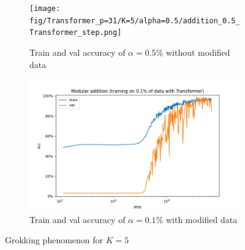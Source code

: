 \begin{figure}[!ht]
	\centering
	\begin{subfigure}{0.45\textwidth}
		\centering
		\texttt{[image: fig/Transformer\_p=31/K=5/alpha=0.5/addition\_0.5\_Transformer\_step.png]}
		\caption{Train and val accuracy of $\alpha=0.5\%$ without modified data}
		\label{fig:alpha=0.5 without modified data}
	\end{subfigure}
	\begin{subfigure}{0.45\textwidth}
		\centering
		\includegraphics[width=\linewidth]{fig/Transformer_p=31/K=5/addition_0.1_Transformer_step.png}
		\caption{Train and val accuracy of $\alpha=0.1\%$ with modified data}
		\label{fig:alpha=0.1 with modified data}
	\end{subfigure}
	
	\caption{Grokking phenomenon for $K=5$}
	\label{fig:grok_of_K=5}
\end{figure}
